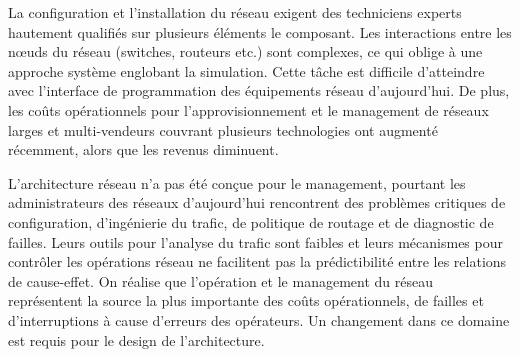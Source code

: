 La configuration et l'installation du réseau exigent des techniciens experts hautement qualifiés sur plusieurs éléments le composant. Les interactions entre les nœuds du réseau (switches, routeurs etc.) sont complexes, ce qui oblige à une approche système englobant la simulation. Cette tâche est difficile d'atteindre avec l'interface de programmation des équipements réseau d'aujourd'hui. De plus, les coûts opérationnels pour l'approvisionnement et le management de réseaux larges et multi-vendeurs  couvrant plusieurs technologies ont augmenté récemment, alors que les revenus diminuent. \cite{ImplementationChallengesForSDN}







L'architecture réseau n'a pas été conçue pour le management, pourtant les administrateurs des réseaux d'aujourd'hui rencontrent des problèmes critiques de configuration, d'ingénierie du trafic, de politique de routage et de diagnostic de failles. Leurs outils pour l'analyse du trafic sont faibles et leurs mécanismes pour contrôler les opérations réseau ne facilitent pas la prédictibilité entre les relations de cause-effet. On réalise que l'opération et le management du réseau représentent la source la plus importante des coûts opérationnels, de failles et d'interruptions à cause d'erreurs des opérateurs. Un changement dans ce domaine est requis pour le design de l'architecture. \cite{NGSIManagement}


\clearpage




